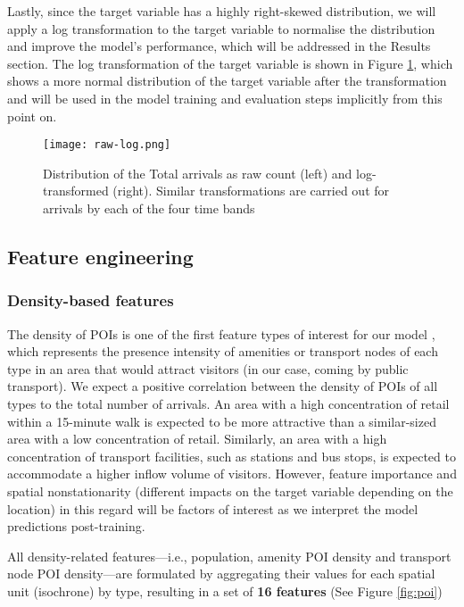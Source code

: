 Lastly, since the target variable has a highly right-skewed distribution, we will apply a log transformation to the target variable to normalise the distribution and improve the model's performance, which will be addressed in the Results section. The log transformation of the target variable is shown in Figure \ref{fig:rawlog}, which shows a more normal distribution of the target variable after the transformation and will be used in the model training and evaluation steps implicitly from this point on.

\begin{figure}[!ht]
    \centering
    \texttt{[image: raw-log.png]}
    \captionsetup{justification=centering}
    \caption{Distribution of the Total arrivals as raw count (left) and log-transformed (right). Similar transformations are carried out for arrivals by each of the four time bands}
    \label{fig:rawlog}
\end{figure}
\subsection{Feature engineering}
\subsubsection*{Density-based features}

The density of POIs is one of the first feature types of interest for our model \citep{cerveroTravelDemand3Ds1997}, which represents the presence intensity of amenities or transport nodes of each type in an area that would attract visitors (in our case, coming by public transport). We expect a positive correlation between the density of POIs of all types to the total number of arrivals. An area with a high concentration of retail within a 15-minute walk is expected to be more attractive than a similar-sized area with a low concentration of retail. Similarly, an area with a high concentration of transport facilities, such as stations and bus stops, is expected to accommodate a higher inflow volume of visitors. However, feature importance and spatial nonstationarity (different impacts on the target variable depending on the location) in this regard will be factors of interest as we interpret the model predictions post-training.

All density-related features---i.e., population, amenity POI density and transport node POI density---are formulated by aggregating their values for each spatial unit (isochrone) by type, resulting in a set of \textbf{16 features} (See Figure \ref{fig:poi})

